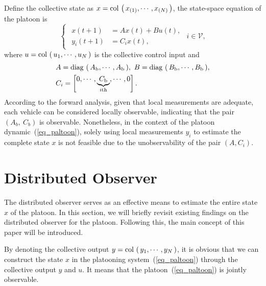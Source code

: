 \documentclass[letterpaper, 10pt, conference]{ieeeconf}  %
\def\col#1{\mathop{{\rm col}\,\left(\,#1\,\right)}}
\def\eqref#1{(\ref{#1})}
\def\V{\mathcal{V}} %
\def\diag#1{\mathop{{\rm diag}\,\left(\,#1\,\right)}}
\begin{document}
Define the collective state as $x = \col{x_{(1)}, \cdots , x_{(N)}}$, the state-space equation of the platoon is 
\begin{equation}
    \begin{cases}
        \begin{aligned}
            x(t+1) & = A x(t) + B u(t),\\
            y_{i}(t+1) &= C_{i} x(t),
        \end{aligned}
    \end{cases} i \in \V,
    \label{eq_paltoon}
\end{equation}
where $u = \col{u_{1}, \cdots , u_{N}}$ is the collective control input and
\begin{equation}
    \begin{aligned}
        &A = \diag {A_{\text{b}}, \cdots , A_{\text{b}}}, \ 
        B = \diag {B_{\text{b}}, \cdots , B_{\text{b}}}, \\
        &C_{i} = \begin{bmatrix}
            0, \cdots , \underbrace{C_{\text{b}}}_{i\text{th}}, \cdots , 0
        \end{bmatrix}.
    \end{aligned}
\end{equation}
According to the forward analysis, given that local measurements are adequate, each vehicle can be considered locally observable, indicating that the pair $(A_{b},\ C_{b})$ is observable. Nonetheless, in the context of the platoon dynamic~\eqref{eq_paltoon}, solely using local measurements $y_{i}$ to estimate the complete state $x$ is not feasible due to the unobservability of the pair $(A, C_{i})$. 





\section{Distributed Observer}\label{sec_Distributed Observer}

The distributed observer serves as an effective means to estimate the entire state $x$ of the platoon. In this section, we will briefly revisit existing findings on the distributed observer for the platoon. Following this, the main concept of this paper will be introduced. 
 
By denoting the collective output $y = \col{y_{1},\cdots, y_{N}}$, it is obvious that we can construct the state $x$ in the platooning system~\eqref{eq_paltoon} through the collective output $y$ and $u$. It means that the platoon~\eqref{eq_paltoon} is jointly observable. 
\end{document}
